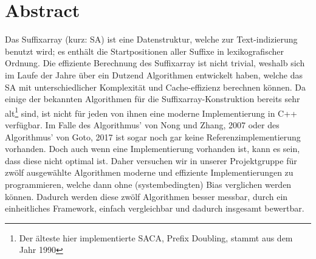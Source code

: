 \chapter*{Abstract}

Das  Suffixarray (kurz: SA) ist eine Datenstruktur, welche zur Text-indizierung benutzt wird; es enthält die Startpositionen aller Suffixe in lexikografischer Ordnung.
Die effiziente Berechnung des Suffixarray ist nicht trivial, weshalb sich im Laufe der Jahre über ein Dutzend Algorithmen entwickelt haben, welche das SA mit unterschiedlicher Komplexität und Cache-effizienz berechnen können.
Da einige der bekannten Algorithmen für die Suffixarray-Konstruktion bereits sehr alt\footnote{Der älteste hier implementierte SACA, Prefix Doubling, stammt aus dem Jahr 1990} sind, ist nicht für jeden von ihnen eine moderne Implementierung in C++ verfügbar.
Im Falle des Algorithmus' von Nong und Zhang, 2007 oder des Algorithmus' von Goto, 2017 ist sogar noch gar keine Referenzimplementierung vorhanden.
Doch auch wenn eine Implementierung vorhanden ist, kann es sein, dass diese nicht optimal ist.
Daher versuchen wir in unserer Projektgruppe für zwölf ausgewählte Algorithmen moderne und effiziente Implementierungen zu programmieren, welche dann ohne (systembedingten) Bias verglichen werden können.
Dadurch werden diese zwölf Algorithmen besser messbar, durch ein einheitliches Framework, einfach vergleichbar und dadurch insgesamt bewertbar.
